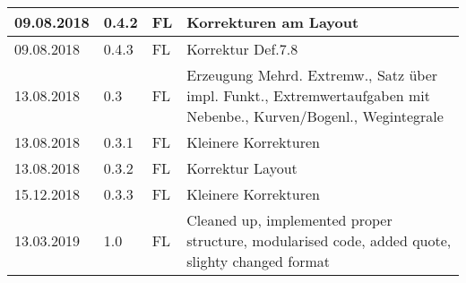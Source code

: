 \begin{tabular}{|p{2cm}|p{1cm}|p{1.5cm}|p{8.5cm}|}
    09.08.2018 & 0.4.2 & FL & Korrekturen am Layout \\ \hline
    09.08.2018 & 0.4.3 & FL & Korrektur Def.7.8 \\ \hline
    13.08.2018 & 0.3 & FL & Erzeugung Mehrd. Extremw., Satz über impl. Funkt., Extremwertaufgaben mit Nebenbe., Kurven/Bogenl., Wegintegrale \\ \hline
    13.08.2018 & 0.3.1 & FL & Kleinere Korrekturen \\ \hline
    13.08.2018 & 0.3.2 & FL & Korrektur Layout \\ \hline
   15.12.2018 & 0.3.3 & FL & Kleinere Korrekturen \\ \hline
   13.03.2019 & 1.0 & FL & Cleaned up, implemented proper structure, modularised  code, added quote, slighty changed format \\ \hline
  \end{tabular}
\listoffigures
